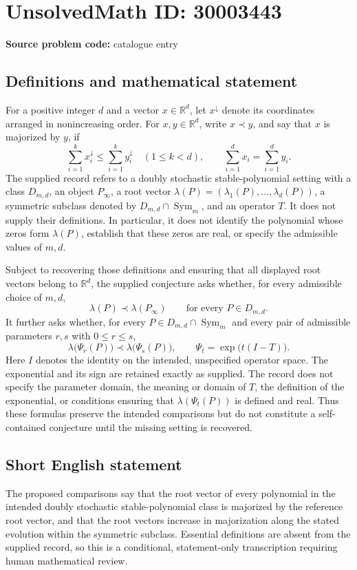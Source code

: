 \documentclass[11pt]{article}
\newcommand{\R}{\mathbb{R}}
\begin{document}
\section*{UnsolvedMath ID: 30003443}
\textbf{Source problem code:} catalogue entry
\subsection{Definitions and mathematical statement}
For a positive integer \(d\) and a vector \(x\in\R^d\), let \(x^{\downarrow}\) denote its coordinates arranged in nonincreasing order. For \(x,y\in\R^d\), write \(x\prec y\), and say that \(x\) is majorized by \(y\), if
\[
\sum_{i=1}^{k}x_i^{\downarrow}\leq\sum_{i=1}^{k}y_i^{\downarrow}\quad(1\leq k<d),
\qquad
\sum_{i=1}^{d}x_i=\sum_{i=1}^{d}y_i.
\]
The supplied record refers to a doubly stochastic stable-polynomial setting with a class \(D_{m,d}\), an object \(P_\infty\), a root vector \(\lambda(P)=(\lambda_1(P),\ldots,\lambda_d(P))\), a symmetric subclass denoted by \(D_{m,d}\cap\operatorname{Sym}_m\), and an operator \(T\). It does not supply their definitions. In particular, it does not identify the polynomial whose zeros form \(\lambda(P)\), establish that these zeros are real, or specify the admissible values of \(m,d\).

Subject to recovering those definitions and ensuring that all displayed root vectors belong to \(\R^d\), the supplied conjecture asks whether, for every admissible choice of \(m,d\),
\[
\lambda(P)\prec\lambda(P_\infty)
\qquad\text{for every }P\in D_{m,d}.
\]
It further asks whether, for every \(P\in D_{m,d}\cap\operatorname{Sym}_m\) and every pair of admissible parameters \(r,s\) with \(0\leq r\leq s\),
\[
\lambda\bigl(\Psi_r(P)\bigr)
\prec
\lambda\bigl(\Psi_s(P)\bigr),
\qquad
\Psi_t=\exp\bigl(t(I-T)\bigr).
\]
Here \(I\) denotes the identity on the intended, unspecified operator space. The exponential and its sign are retained exactly as supplied. The record does not specify the parameter domain, the meaning or domain of \(T\), the definition of the exponential, or conditions ensuring that \(\lambda(\Psi_t(P))\) is defined and real. Thus these formulas preserve the intended comparisons but do not constitute a self-contained conjecture until the missing setting is recovered.
\subsection{Short English statement}
The proposed comparisons say that the root vector of every polynomial in the intended doubly stochastic stable-polynomial class is majorized by the reference root vector, and that the root vectors increase in majorization along the stated evolution within the symmetric subclass. Essential definitions are absent from the supplied record, so this is a conditional, statement-only transcription requiring human mathematical review.
\end{document}
